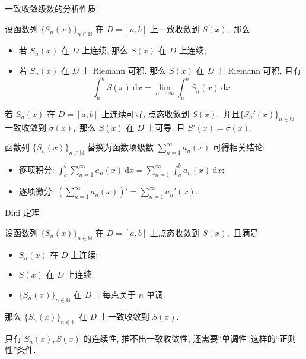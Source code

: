 
\begin{frame}{一致收敛级数的分析性质}

设函数列 $\{S_n(x)\}_{n\in\mathbb{N}}$ 在 $D = [a, b]$ 上一致收敛到 $S(x),$ 那么
\pause
\begin{itemize}
\item 若 $S_n(x)$ 在 $D$ 上连续, 那么 $S(x)$ 在 $D$ 上连续;
\pause
\item 若 $S_n(x)$ 在 $D$ 上 Riemann 可积, 那么 $S(x)$ 在 $D$ 上 Riemann 可积, 且有
\[\int_a^b S(x) ~ \mathrm{d} x = \lim\limits_{n\to\infty} \int_a^b S_n(x) ~ \mathrm{d} x\]
\end{itemize}

\pause

若 $S_n(x)$ 在 $D = [a,b]$ 上连续可导, 点态收敛到 $S(x),$ 并且$\{S_n'(x)\}_{n\in\mathbb{N}}$ 一致收敛到 $\sigma(x),$ 那么 $S(x)$ 在 $D$ 上可导, 且 $S'(x) = \sigma(x).$

\pause

函数列 $\{S_n(x)\}_{n\in\mathbb{N}}$ 替换为函数项级数 $\sum\limits_{n=1}^\infty a_n(x)$ 可得相关结论:
\begin{itemize}
\item 逐项积分: $\int_a^b \sum\limits_{n=1}^\infty a_n(x) ~ \mathrm{d} x = \sum\limits_{n=1}^\infty \int_a^b a_n(x) ~ \mathrm{d} x;$
\item 逐项微分: $\left( \sum\limits_{n=1}^\infty a_n(x) \right)' = \sum\limits_{n=1}^\infty a_n'(x).$
\end{itemize}

\end{frame}


\begin{frame}{Dini 定理}

\begin{thm}[Dini 定理]
设函数列 $\{S_n(x)\}_{n\in\mathbb{N}}$ 在 $D = [a, b]$ 上点态收敛到 $S(x),$ 且满足
\begin{itemize}
\item $S_n(x)$ 在 $D$ 上连续;
\item $S(x)$ 在 $D$ 上连续;
\item $\{S_n(x)\}_{n\in\mathbb{N}}$ 在 $D$ 上每点关于 $n$ 单调.
\end{itemize}
那么 $\{S_n(x)\}_{n\in\mathbb{N}}$ 在 $D$ 上一致收敛到 $S(x).$
\end{thm}

\pause

\begin{attnblock}
只有 $S_n(x), S(x)$ 的连续性, 推不出一致收敛性, 还需要``单调性''这样的``正则性''条件.
\end{attnblock}

\end{frame}

